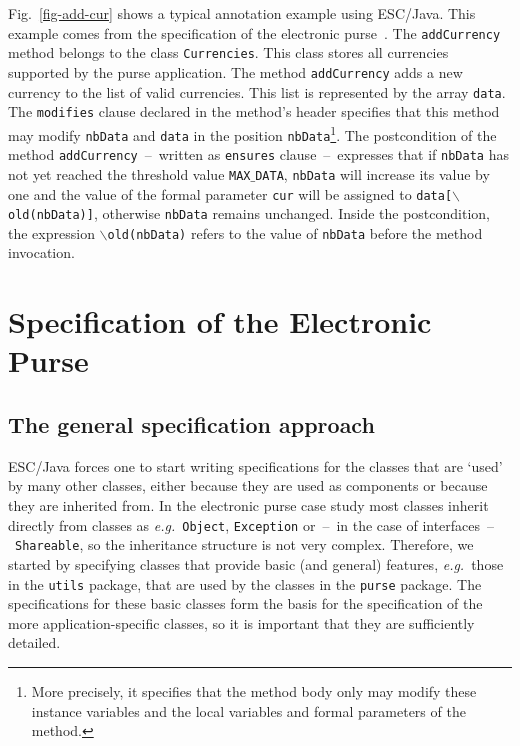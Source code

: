 \documentclass[a4paper]{llncs}
\begin{document}
Fig.~\ref{fig-add-cur} shows a typical annotation example using
ESC/Java. This example comes from the specification of the
electronic purse~\cite{CatanoH01Url}. The \texttt{addCurrency} method belongs
to the class \texttt{Currencies}. This class stores all currencies
supported by the purse application. The method
\texttt{addCurrency} adds a new currency to the list of valid
currencies. This list is represented by the
array \texttt{data}. The \texttt{modifies} clause declared in the
method's header specifies that
this method may modify \texttt{nbData} and
\texttt{data} in the position \texttt{nbData}\footnote{More precisely, it
specifies that the method body only may modify these instance
variables and the local variables and formal parameters of the
method.}. The postcondition of the method
\texttt{addCurrency}~--~written as
\texttt{ensures} clause~--~expresses that if \texttt{nbData} has not
yet reached the threshold value \texttt{MAX$\_$DATA}, \texttt{nbData}
will increase its value by one and the value of the formal parameter
\texttt{cur} will be assigned to \texttt{data[\(\backslash\)old(nbData)]}, 
otherwise \texttt{nbData} remains unchanged.  Inside the
postcondition, the expression
\texttt{$\backslash$old(nbData)} refers to the value of
\texttt{nbData} before the method invocation.






\section{Specification of the Electronic Purse}
\label{SectSpecPurse}


\subsection{The general specification approach}
ESC/Java forces one to start writing specifications for the classes
that are `used' by many other classes, either because they are used as 
components or because they are inherited from. In the electronic purse 
case study most classes inherit directly from classes as
\emph{e.g.}~\texttt{Object}, \texttt{Exception} or~--~in the case of
interfaces~--~\texttt{Shareable}, so the inheritance structure is not
very complex. Therefore, we started by specifying classes that
provide basic (and general) features, \emph{e.g.}~those in the
\texttt{utils} package,
that are used by the classes in the \texttt{purse} package. The
specifications for these basic classes form the basis for the
specification of the more application-specific classes, so it is
important that they are sufficiently detailed.
\end{document}
